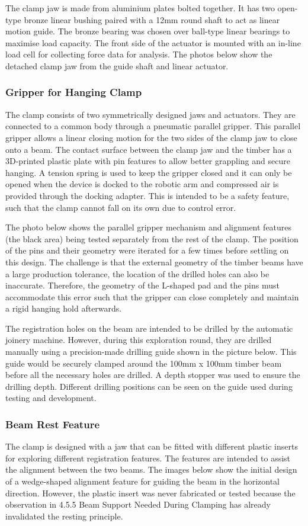 The clamp jaw is made from aluminium plates bolted together. It has two open-type bronze linear bushing paired with a 12mm round shaft to act as linear motion guide. The bronze bearing was chosen over ball-type linear bearings to maximise load capacity. The front side of the actuator is mounted with an in-line load cell for collecting force data for analysis. The photos below show the detached clamp jaw from the guide shaft and linear actuator. 

\subsubsection{Gripper for Hanging Clamp}
The clamp consists of two symmetrically designed jaws and actuators. They are connected to a common body through a pneumatic parallel gripper. This parallel gripper allows a linear closing motion for the two sides of the clamp jaw to close onto a beam.
The contact surface between the clamp jaw and the timber has a 3D-printed plastic plate with pin features to allow better grappling and secure hanging. A tension spring is used to keep the gripper closed and it can only be opened when the device is docked to the robotic arm and compressed air is provided through the docking adapter. This is intended to be a safety feature, such that the clamp cannot fall on its own due to control error.

The photo below shows the parallel gripper mechanism and alignment features (the black area) being tested separately from the rest of the clamp. The position of the pins and their geometry were iterated for a few times before settling on this design. The challenge is that the external geometry of the timber beams have a large production tolerance, the location of the drilled holes can also be inaccurate. Therefore, the geometry of the L-shaped pad and the pins must accommodate this error such that the gripper can close completely and maintain a rigid hanging hold afterwards.

The registration holes on the beam are intended to be drilled by the automatic joinery machine. However, during this exploration round, they are drilled manually using a precision-made drilling guide shown in the picture below. This guide would be securely  clamped around the 100mm x 100mm timber beam before all the necessary holes are drilled. A depth stopper was used to ensure the drilling depth. Different drilling positions can be seen on the guide used during testing and development.


\subsubsection{Beam Rest Feature}
The clamp is designed with a jaw that can be fitted with different plastic inserts for exploring different registration features. The features are intended to assist the alignment between the two beams. The images below show the initial design of a wedge-shaped alignment feature for guiding the beam in the horizontal direction. However, the plastic insert was never fabricated or tested because the observation in 4.5.5 Beam Support Needed During Clamping has already invalidated the resting principle.

